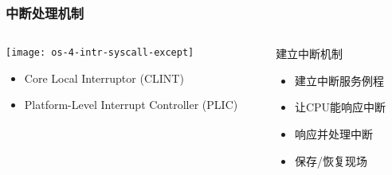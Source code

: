 \begin{frame}[plain,t]
	\frametitle{中断处理机制}
	\begin{columns}
		
		\begin{column}{0.45\textwidth}
			\centering
			\texttt{[image: os-4-intr-syscall-except]}
			\begin{itemize} \small
				\item Core Local	Interruptor (CLINT)
				\item Platform-Level Interrupt Controller (PLIC)
			\end{itemize}
			
		\end{column}
		
		\begin{column}{0.5\textwidth}
			
			\centering
			\LARGE 建立中断机制 \pause
			
			\Large
			\begin{itemize}
				\item 建立中断服务例程	 \pause
				\item 让CPU能响应中断 \pause
				\item 响应并处理中断 \pause
				\item 保存/恢复现场 
			\end{itemize}		
			
		\end{column}
		
	\end{columns}
	
\end{frame}


